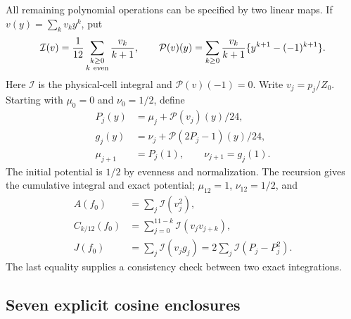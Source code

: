 \documentclass[11pt,reqno]{amsart}
\numberwithin{equation}{section}
\begin{document}
All remaining polynomial operations can be specified by
two linear maps. If $v(y)=\sum_kv_ky^k$, put
\[
 \mathcal I(v)=\frac1{12}
 \sum_{\substack{k\ge0\\k\ {\rm even}}}\frac{v_k}{k+1},
 \qquad
 \mathcal P(v)(y)=\sum_{k\ge0}\frac{v_k}{k+1}
                 \{y^{k+1}-(-1)^{k+1}\}.
\]
Here $\mathcal I$ is the physical-cell integral and
$\mathcal P(v)(-1)=0$.
Write $v_j=p_j/Z_0$. Starting with $\mu_0=0$ and $\nu_0=1/2$,
define
\begin{equation}
 \begin{split}
 P_j(y)&=\mu_j+\mathcal P(v_j)(y)/24,\\
 g_j(y)&=\nu_j+\mathcal P(2P_j-1)(y)/24,\\
 \mu_{j+1}&=P_j(1),\qquad\nu_{j+1}=g_j(1).
 \end{split}
 \label{eq:twelve-potential-recursion}
\end{equation}
The initial potential is $1/2$ by evenness and normalization.
The recursion gives the cumulative integral and exact potential;
$\mu_{12}=1$, $\nu_{12}=1/2$, and
\begin{equation}
 \begin{split}
 A(f_0)&=\sum_j\mathcal I(v_j^2),\\
 C_{k/12}(f_0)&=\sum_{j=0}^{11-k}\mathcal I(v_jv_{j+k}),\\
 J(f_0)&=\sum_j\mathcal I(v_jg_j)
        =2\sum_j\mathcal I(P_j-P_j^2).
 \end{split}
 \label{eq:twelve-exact-integration}
\end{equation}
The last equality supplies a consistency check between two
exact integrations.

\subsection{Seven explicit cosine enclosures}
\end{document}

